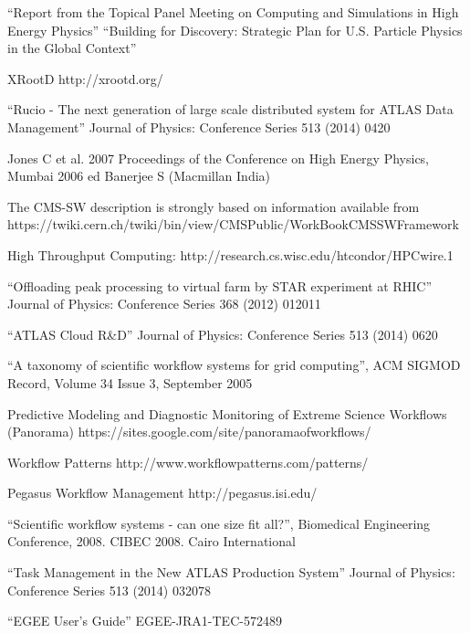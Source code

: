 \begin{thebibliography}{99}
 ``Report from the Topical Panel Meeting on Computing and
Simulations in High Energy Physics''
 ``Building for Discovery: Strategic Plan for U.S. Particle Physics in the Global Context''

 XRootD http://xrootd.org/

 ``Rucio - The next generation of large scale distributed system for ATLAS Data Management'' Journal of Physics: Conference Series 513 (2014) 0420


 Jones C et al. 2007 Proceedings of the Conference on High Energy Physics, Mumbai 2006 ed Banerjee S (Macmillan India)

 The CMS-SW description is strongly based on information available from https://twiki.cern.ch/twiki/bin/view/CMSPublic/WorkBookCMSSWFramework

 High Throughput Computing: http://research.cs.wisc.edu/htcondor/HPCwire.1

 ``Offloading peak processing to virtual farm by STAR experiment at RHIC'' Journal of Physics: Conference Series 368 (2012) 012011

 ``ATLAS Cloud R\&D'' Journal of Physics: Conference Series 513 (2014) 0620

 ``A taxonomy of scientific workflow systems for grid computing'', ACM SIGMOD Record, Volume 34 Issue 3, September 2005

 Predictive Modeling and Diagnostic Monitoring of Extreme Science Workflows (Panorama) https://sites.google.com/site/panoramaofworkflows/

 Workflow Patterns http://www.workflowpatterns.com/patterns/

 Pegasus Workflow Management http://pegasus.isi.edu/

 ``Scientific workflow systems - can one size fit all?'', Biomedical Engineering Conference, 2008. CIBEC 2008. Cairo International

 ``Task Management in the New ATLAS Production System'' Journal of Physics: Conference Series 513 (2014) 032078

 ``EGEE User’s Guide'' EGEE-JRA1-TEC-572489


\end{thebibliography}
